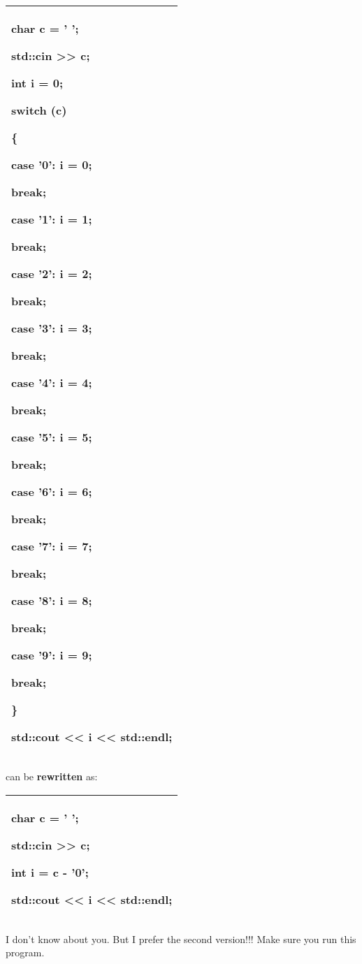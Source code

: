\documentclass[
]{article}
\begin{document}
\begin{longtable}[]{@{}l@{}}
\toprule
\endhead
\begin{minipage}[t]{0.97\columnwidth}\raggedright
char c = ' ';

std::cin \textgreater\textgreater{} c;

int i = 0;

switch (c)

\{

case '0': i = 0;

break;

case '1': i = 1;

break;

case '2': i = 2;

break;

case '3': i = 3;

break;

case '4': i = 4;

break;

case '5': i = 5;

break;

case '6': i = 6;

break;

case '7': i = 7;

break;

case '8': i = 8;

break;

case '9': i = 9;

break;

\}

std::cout \textless\textless{} i \textless\textless{} std::endl;\strut
\end{minipage}\tabularnewline
\bottomrule
\end{longtable}

can be \textbf{rewritten} as:

\begin{longtable}[]{@{}l@{}}
\toprule
\endhead
\begin{minipage}[t]{0.97\columnwidth}\raggedright
char c = ' ';

std::cin \textgreater\textgreater{} c;

int i = c - '0';

std::cout \textless\textless{} i \textless\textless{} std::endl;\strut
\end{minipage}\tabularnewline
\bottomrule
\end{longtable}

I don't know about you. But I prefer the second version!!! Make sure you
run this program.
\end{document}
